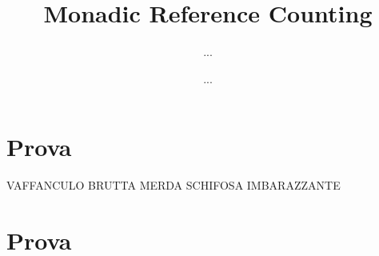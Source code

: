 \documentclass{article}
\title{Monadic Reference Counting}
\author{...}
\date{...}
\begin{document}
\maketitle

\section{Prova}
VAFFANCULO BRUTTA MERDA SCHIFOSA
IMBARAZZANTE

\section{Prova}
\end{document}
